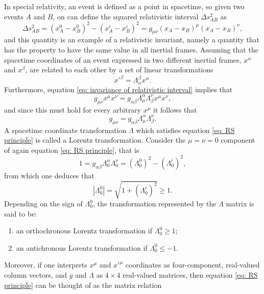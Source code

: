 In special relativity, an event is defined as a point in spacetime, so given two events $A$ and $B$, on can define the squared relativistic interval $\Delta s_{AB}^2$ as
\begin{equation}
    \Delta s_{AB}^2 = (x_A^0 - x_B^0)^2 - (x_A^i - x_B^i)^2 = g_{\mu\nu}(x_A - x_B)^\mu(x_A - x_B)^\nu,
\end{equation}
and this quantity is an example of a relativistic invariant, namely a quantity that has the property to have the same value in all inertial frames. Assuming that the spacetime coordinates of an event expressed in two different inertial frames, $x^\alpha$ and $x^\beta$, are related to each other by a set of linear transformations
\begin{equation}
\label{eq: Lorentz transformation}
    x'^\beta = \Lambda^\beta_\alpha x^\alpha.
\end{equation}
Furthermore, equation \eqref{eq: invariance of relativistic interval} implies that 
\begin{equation}
    g_{\mu\nu}x^\mu x^\nu = g_{\alpha\beta}\Lambda^\alpha_\mu \Lambda^\nu_\beta x^\mu x^\nu,
\end{equation}
and since this must hold for every arbitrary $x^\mu$ it follows that
\begin{equation}
\label{eq: RS principle}
    g_{\mu\nu} = g_{\alpha\beta}\Lambda^\alpha_\mu \Lambda^\nu_\beta.
\end{equation}
A spacetime coordinate transformation $\Lambda$ which satisfies equation \eqref{eq: RS principle} is called a Lorentz transformation. Consider the $\mu = \nu = 0$ component of again equation \eqref{eq: RS principle}, that is 
\begin{equation}
    1 = g_{\alpha\beta}\Lambda^\alpha_0 \Lambda^\nu_0 = (\Lambda_0^0)^2 - (\Lambda_0^i)^2,
\end{equation}
from which one deduces that
\begin{equation}
    |\Lambda^0_0| = \sqrt{1 + (\Lambda_0^i)^2} \ge 1.
\end{equation}
Depending on the sign of $\Lambda_0^0$, the transformation represented by the $\Lambda$ matrix is said to be:
\begin{enumerate}
    \item an orthochronous Lorentz transformation if $\Lambda_0^0 \ge 1$;
    \item an antichronous Lorentz transformation if $\Lambda_0^0 \le -1$.
\end{enumerate}
Moreover, if one interprets $x^\mu$ and $x'^\mu$ coordinates as four-component, real-valued column vectors, and $g$ and $\Lambda$ as $4 \times 4$ real-valued matrices, then equation \eqref{eq: RS principle} can be thought of as the matrix relation 
